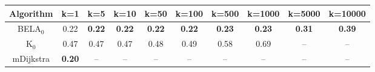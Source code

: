 \begin{tabular}{c|ccccccccc}\toprule
Algorithm & k=1 & k=5 & k=10 & k=50 & k=100 & k=500 & k=1000 & k=5000 & k=10000 \\ \midrule
BELA$_0$ & 0.22 & \textbf{0.22} & \textbf{0.22} & \textbf{0.22} & \textbf{0.22} & \textbf{0.23} & \textbf{0.23} & \textbf{0.31} & \textbf{0.39} \\
K$_0$ & 0.47 & 0.47 & 0.47 & 0.48 & 0.49 & 0.58 & 0.69 & -- & -- \\
mDijkstra & \textbf{0.20} & -- & -- & -- & -- & -- & -- & -- & -- \\ \bottomrule 
\end{tabular}
